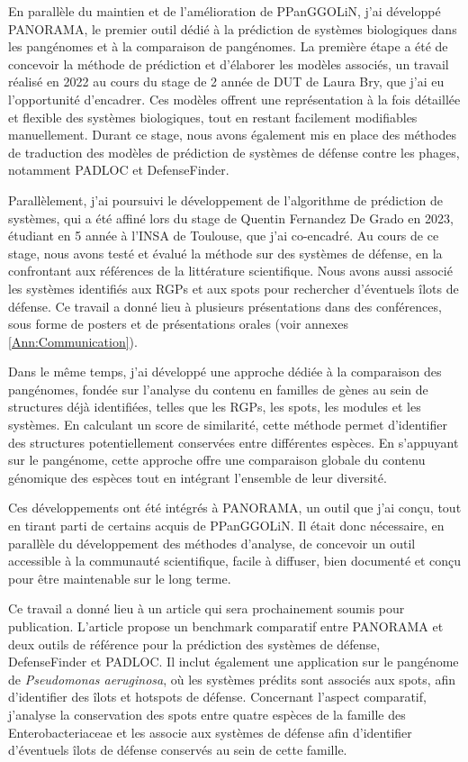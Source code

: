 En parallèle du maintien et de l’amélioration de PPanGGOLiN, j’ai développé PANORAMA, le premier outil dédié à la prédiction de systèmes biologiques dans les pangénomes et à la comparaison de pangénomes. La première étape a été de concevoir la méthode de prédiction et d’élaborer les modèles associés, un travail réalisé en 2022 au cours du stage de 2\ieme{} année de DUT de Laura Bry, que j’ai eu l’opportunité d’encadrer. Ces modèles offrent une représentation à la fois détaillée et flexible des systèmes biologiques, tout en restant facilement modifiables manuellement. Durant ce stage, nous avons également mis en place des méthodes de traduction des modèles de prédiction de systèmes de défense contre les phages, notamment PADLOC et DefenseFinder.

Parallèlement, j’ai poursuivi le développement de l’algorithme de prédiction de systèmes, qui a été affiné lors du stage de Quentin Fernandez De Grado en 2023, étudiant en 5\ieme{} année à l’INSA de Toulouse, que j’ai co-encadré. Au cours de ce stage, nous avons testé et évalué la méthode sur des systèmes de défense, en la confrontant aux références de la littérature scientifique. Nous avons aussi associé les systèmes identifiés aux RGPs et aux spots pour rechercher d’éventuels îlots de défense. Ce travail a donné lieu à plusieurs présentations dans des conférences, sous forme de posters et de présentations orales (voir annexes \ref{Ann:Communication}).

Dans le même temps, j’ai développé une approche dédiée à la comparaison des pangénomes, fondée sur l’analyse du contenu en familles de gènes au sein de structures déjà identifiées, telles que les RGPs, les spots, les modules et les systèmes. En calculant un score de similarité, cette méthode permet d’identifier des structures potentiellement conservées entre différentes espèces. En s’appuyant sur le pangénome, cette approche offre une comparaison globale du contenu génomique des espèces tout en intégrant l’ensemble de leur diversité.

Ces développements ont été intégrés à PANORAMA, un outil que j’ai conçu, tout en tirant parti de certains acquis de PPanGGOLiN. Il était donc nécessaire, en parallèle du développement des méthodes d’analyse, de concevoir un outil accessible à la communauté scientifique, facile à diffuser, bien documenté et conçu pour être maintenable sur le long terme.

Ce travail a donné lieu à un article qui sera prochainement soumis pour publication. L’article propose un benchmark comparatif entre PANORAMA et deux outils de référence pour la prédiction des systèmes de défense, DefenseFinder et PADLOC. Il inclut également une application sur le pangénome de \textit{Pseudomonas aeruginosa}, où les systèmes prédits sont associés aux spots, afin d’identifier des îlots et hotspots de défense. Concernant l’aspect comparatif, j’analyse la conservation des spots entre quatre espèces de la famille des Enterobacteriaceae et les associe aux systèmes de défense afin d’identifier d’éventuels îlots de défense conservés au sein de cette famille.

